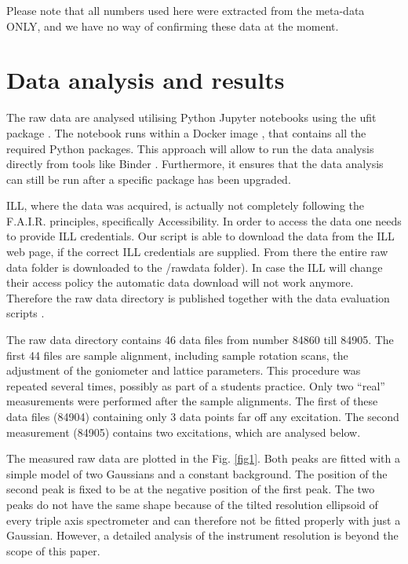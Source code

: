 \documentclass[aps,pra,reprint,amsmath,amssymb,superscriptaddress,showkeys]{revtex4-1}
\begin{document}
Please note that all numbers used here were extracted from the meta-data ONLY, and we have no way of confirming these data at the moment. 


\section{Data analysis and results}

The raw data are analysed utilising Python Jupyter notebooks \cite{jupyter} using the ufit package \cite{ufit}.
The notebook \cite{data-evaluation} runs within a Docker image \cite{Docker}, that contains all the required Python packages.
This approach will allow to run the data analysis \cite{data-docker} directly from tools like Binder \cite{binder}.
Furthermore, it ensures that the data analysis can still be run after a specific package has been upgraded.

ILL, where the data was acquired, is actually not completely following the F.A.I.R. principles, specifically Accessibility. 
In order to access the data one needs to provide ILL credentials. 
Our script is able to download the data from the ILL web page, if the correct ILL credentials are supplied. 
From there the entire raw data folder is downloaded to the /rawdata folder). 
In case the ILL will change their access policy the automatic data download will not work anymore. 
Therefore the raw data directory is published together with the data evaluation scripts \cite{data-evaluation}.

The raw data directory contains 46 data files from number 84860 till 84905. 
The first 44 files are sample alignment, including sample rotation scans, the adjustment of the goniometer and lattice parameters. 
This procedure was repeated several times, possibly as part of a students practice.
Only two ``real'' measurements were performed after the sample alignments.
The first of these data files (84904) containing only 3 data points far off any excitation.
The second measurement (84905) contains two excitations, which are analysed below.

The measured raw data are plotted in the Fig. \ref{fig1}.
Both peaks are fitted with a simple model of two Gaussians and a constant background. 
The position of the second peak is fixed to be at the negative position of the first peak. 
The two peaks do not have the same shape because of the tilted resolution ellipsoid of every triple axis spectrometer and can therefore not be fitted properly with just a Gaussian. 
However, a detailed analysis of the instrument resolution is beyond the scope of this paper.
\end{document}
